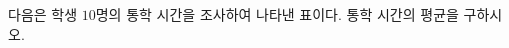 다음은 학생 $10$명의 통학 시간을 조사하여 나타낸 표이다. 통학 시간의 평균을 구하시오.
\par\smallskip\begin{center}\resizebox{\ifdim\width>\linewidth\linewidth\else\width\fi}{!}{}\end{center}
